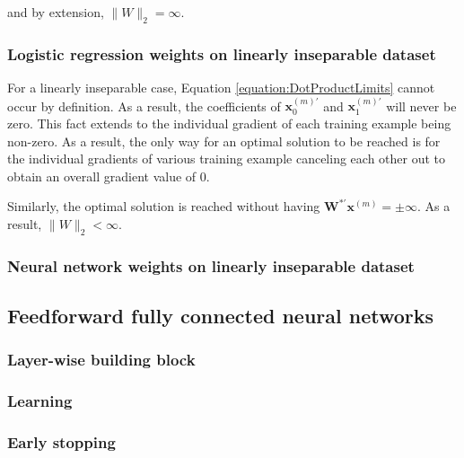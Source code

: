 \documentclass[a4paper,12pt]{article}
\begin{document}
and by extension, $\|W\|_2 = \infty$.

\subsubsection{Logistic regression weights on linearly inseparable dataset}

For a linearly inseparable case, Equation \ref{equation:DotProductLimits} cannot occur by definition. As a result, the coefficients of $\mathbf{x}_0^{(m)'}$ and $\mathbf{x}_1^{(m)'}$ will never be zero. This fact extends to the individual gradient of each training example being non-zero. As a result, the only way for an optimal solution to be reached is for the individual gradients of various training example canceling each other out to obtain an overall gradient value of 0. 

Similarly, the optimal solution is reached without having $\mathbf{W}^{*'} \mathbf{x}^{(m)} = \pm \infty$. As a result, $\|W\|_2 < \infty$.

\clearpage
\subsubsection{Neural network weights on linearly inseparable dataset}

\clearpage
\subsection{Feedforward fully connected neural networks}
\subsubsection{Layer-wise building block}

\clearpage
\subsubsection{Learning}

\clearpage
\subsubsection{Early stopping}
\end{document}
